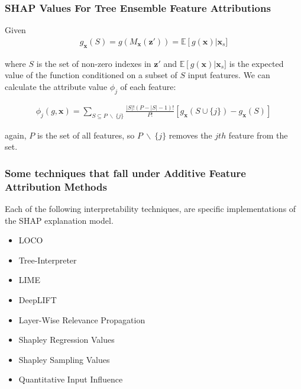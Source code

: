 \begin{frame}\frametitle{SHAP Values For Tree Ensemble Feature Attributions}

Given  
	\begin{equation}
		\begin{aligned}	
		g_\mathbf{x}(S) = g(M_{\mathbf{x}}(\mathbf{z'}))= \mathbb{E}\left[ g(\mathbf{x})\right | \mathbf{x}_s ]
		\end{aligned}
	\end{equation}

where $S$ is the set of non-zero indexes in $\mathbf{z'}$ and $ \mathbb{E}\left[ g(\mathbf{x})\right | \mathbf{x}_s ]$ is the expected value of the function conditioned on a subset of $S$ input features. We can calculate the attribute value $\phi_j$ of each feature:

\begin{equation}
	\begin{aligned}	
\phi_j(g,\mathbf{x}) = \sum_{S \subseteq P \: \backslash \: \{j\}} \frac{\left\vert{S}\right\vert!(P-\left\vert{S}\right\vert-1)!}{P!} \left[ g_\mathbf{x}(S \cup \{j\}) - g_\mathbf{x}(S) \right]
	\end{aligned}
	\end{equation}

again, $P$ is the set of all features, so $P \: \backslash \: \{j\}$ removes the $jth$ feature from the set.
\end{frame}


\begin{frame}\frametitle{Some techniques that fall under Additive Feature Attribution Methods}
Each of the following interpretability techniques, are specific implementations of the SHAP explanation model. 
	\begin{itemize}
		\item LOCO
		\item Tree-Interpreter
		\item LIME
		\item DeepLIFT
		\item Layer-Wise Relevance Propagation
		\item Shapley Regression Values
		\item Shapley Sampling Values
		\item Quantitative Input Influence
	\end{itemize}
\end{frame}



